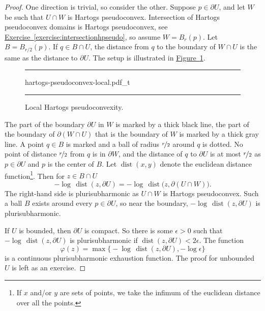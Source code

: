 \documentclass[12pt,openany]{book}
\theoremstyle{plain}
\theoremstyle{remark}
\theoremstyle{definition}
\newenvironment{myfig}{%
\begin{figure}[h!t]
\noindent\rule{\textwidth}{0.5pt}\vspace{12pt}\par\centering}%
{\par\noindent\rule{\textwidth}{0.5pt}
\end{figure}}
\theoremstyle{exercise}
\theoremstyle{example}
\newcommand{\figureref}[1]{\hyperref[#1]{Figure~\ref*{#1}}}
\newcommand{\exerciseref}[1]{\hyperref[#1]{Exercise~\ref*{#1}}}
\begin{document}
\begin{proof}
One direction is trivial, so consider the other.
Suppose $p \in \partial U$, and let
$W$ be such that $U \cap W$
is Hartogs pseudoconvex.  Intersection of
Hartogs pseudoconvex domains is Hartogs pseudoconvex,
see \exerciseref{exercise:intersectionhpseudo}, so
assume $W = B_r(p)$.
Let $B = B_{r/2}(p)$.  If $q \in B \cap U$, the distance from $q$ to the boundary of $W \cap U$ is the same as
the distance to $\partial U$.  The setup is illustrated in
\figureref{fig:hartogs-pseudoconvex-local}.

\begin{myfig}
{hartogs-pseudoconvex-local.pdf_t}
\caption{Local Hartogs pseudoconvexity.\label{fig:hartogs-pseudoconvex-local}}
\end{myfig}

The part of the boundary $\partial U$ in $W$ is marked by a thick
black line, the part of the boundary of $\partial (W \cap U)$ that is
the boundary of $W$ is marked by a thick gray line.  A point $q \in B$ is
marked and a ball of radius $\nicefrac{r}{2}$ around $q$ is dotted.
No point of distance $\nicefrac{r}{2}$ from $q$ is in $\partial W$, and
the distance of $q$ to $\partial U$ is at most $\nicefrac{r}{2}$ as $p \in \partial U$
and $p$ is the center of $B$.
%
Let $\operatorname{dist}(x,y)$ denote the
euclidean distance function\footnote{If $x$ and/or $y$ are sets
of points, we take the infimum of the euclidean distance over all the points.}.
Then for $z \in B \cap U$
\begin{equation*}
- \log \, \operatorname{dist}(z, \partial U) =
- \log \, \operatorname{dist}\bigl(z, \partial (U \cap W)\bigr).
\end{equation*}
The right-hand side is plurisubharmonic as $U \cap W$ is Hartogs
pseudoconvex.  Such a ball $B$ exists around every $p \in \partial U$, so near
the boundary, $- \log \, \operatorname{dist}(z, \partial U)$ is
plurisubharmonic.

If $U$ is bounded, then $\partial U$ is compact.  So there is some
$\epsilon > 0$ such that $- \log \, \operatorname{dist}(z, \partial U)$
is plurisubharmonic if $\operatorname{dist}(z, \partial U) < 2\epsilon$.
The function
\begin{equation*}
\varphi(z) = \max \bigl\{
- \log \, \operatorname{dist}(z, \partial U) , - \log \epsilon \bigr\}
\end{equation*}
is a continuous plurisubharmonic exhaustion function.
The proof for
unbounded $U$ is left as an exercise.
\end{proof}
\end{document}
